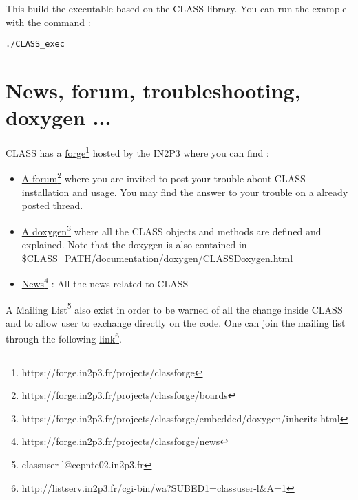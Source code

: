 This build the executable based on the CLASS library. You can run the example with the command : 

\begin{center}
\begin{minipage}{\textwidth}
\begin{lstlisting}[style=terminal]
./CLASS_exec
\end{lstlisting}
\end{minipage}
\end{center}

\chapter{News, forum, troubleshooting, doxygen ...}
CLASS has a \href{https://forge.in2p3.fr/projects/classforge}{forge}\footnote{https://forge.in2p3.fr/projects/classforge} hosted by the IN2P3  where you can find :

\begin{itemize}
\item \href{https://forge.in2p3.fr/projects/classforge/boards}{A forum}\footnote{https://forge.in2p3.fr/projects/classforge/boards} where you are invited to post your trouble about CLASS installation and usage. You may find the answer to your trouble on a already posted thread.
\item \href{https://forge.in2p3.fr/projects/classforge/embedded/doxygen/inherits.html}{A doxygen}\footnote{https://forge.in2p3.fr/projects/classforge/embedded/doxygen/inherits.html} where all the CLASS objects and methods are defined and explained. Note that the doxygen is also contained in \$CLASS\_PATH/documentation/doxygen/CLASSDoxygen.html
\item \href{https://forge.in2p3.fr/projects/classforge/news}{News}\footnote{https://forge.in2p3.fr/projects/classforge/news} : All the news related to CLASS
\end{itemize}
A \href{classuser-l@ccpntc02.in2p3.fr}{Mailing List}\footnote{classuser-l@ccpntc02.in2p3.fr} also exist in order to be warned of all the change inside CLASS and to allow user to exchange directly on the code. One can join the mailing list through the following  \href{http://listserv.in2p3.fr/cgi-bin/wa?SUBED1=classuser-l&A=1}{link}\footnote{http://listserv.in2p3.fr/cgi-bin/wa?SUBED1=classuser-l\&A=1}.



